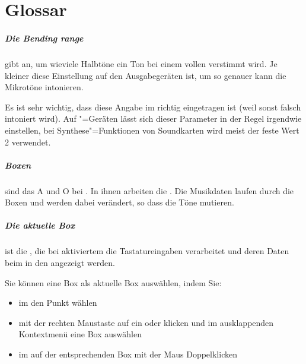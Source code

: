 \appendix

\chapter{Glossar}

\paragraph{Die Bending range}\label{sec:DV_BENDINGRANGE}gibt an,
  um wieviele Halbtöne ein Ton bei einem vollen
   verstimmt wird. Je kleiner diese
  Einstellung auf den Ausgabegeräten ist, um so genauer kann
  \mutabor{} die Mikrotöne intonieren.

  Es ist sehr wichtig, dass diese Angabe im
   richtig eingetragen ist (weil
  sonst falsch intoniert wird). Auf
  "=Geräten lässt sich dieser Parameter in
  der Regel irgendwie einstellen, bei Synthese"=Funktionen von
  Soundkarten wird meist der feste Wert 2 verwendet.

\paragraph{Boxen}\label{sec:DV_BOX} sind das A und O bei
  \mutabor[~3]. In ihnen arbeiten die
  . Die Musikdaten
  laufen durch die Boxen und werden dabei verändert, so dass die Töne
  mutieren.

\paragraph{Die aktuelle Box}\label{sec:DV_CURRENTBOX} ist die
  , die bei aktiviertem
   die Tastatureingaben
  verarbeitet und deren Daten beim  in den
   angezeigt werden.

  Sie können eine Box als aktuelle Box auswählen, indem Sie:
  \begin{itemize}
  \item im  den Punkt
     wählen
  \item mit der rechten Maustaste auf ein
     oder
     klicken und im
    ausklappenden Kontextmenü eine Box auswählen
  \item im  auf der
    entsprechenden Box mit der Maus Doppelklicken
  \end{itemize}

